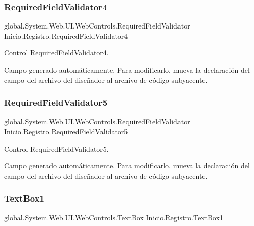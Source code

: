 \subsubsection{\texorpdfstring{RequiredFieldValidator4}{RequiredFieldValidator4}}
{\footnotesize\ttfamily global.\+System.\+Web.\+U\+I.\+Web\+Controls.\+Required\+Field\+Validator Inicio.\+Registro.\+Required\+Field\+Validator4\hspace{0.3cm}{\ttfamily [protected]}}



Control Required\+Field\+Validator4. 

Campo generado automáticamente. Para modificarlo, mueva la declaración del campo del archivo del diseñador al archivo de código subyacente. \mbox{\label{classInicio_1_1Registro_af4f83864caf67319997d2b41fb4298b2}} 
\subsubsection{\texorpdfstring{RequiredFieldValidator5}{RequiredFieldValidator5}}
{\footnotesize\ttfamily global.\+System.\+Web.\+U\+I.\+Web\+Controls.\+Required\+Field\+Validator Inicio.\+Registro.\+Required\+Field\+Validator5\hspace{0.3cm}{\ttfamily [protected]}}



Control Required\+Field\+Validator5. 

Campo generado automáticamente. Para modificarlo, mueva la declaración del campo del archivo del diseñador al archivo de código subyacente. \mbox{\label{classInicio_1_1Registro_ab767617adc8dcd13a78c70824d55eb24}} 
\subsubsection{\texorpdfstring{TextBox1}{TextBox1}}
{\footnotesize\ttfamily global.\+System.\+Web.\+U\+I.\+Web\+Controls.\+Text\+Box Inicio.\+Registro.\+Text\+Box1\hspace{0.3cm}{\ttfamily [protected]}}



